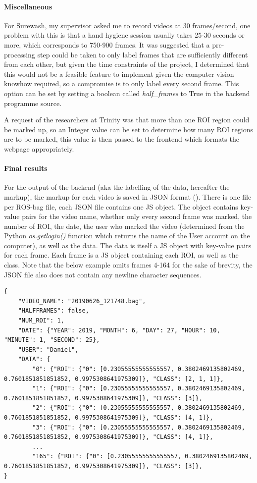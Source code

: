     \paragraph{Miscellaneous}
    For Surewash, my supervisor asked me to record videos at 30 frames/second, one problem with this is that a hand hygiene session usually takes 25-30 seconds or more, which corresponds to 750-900 frames. It was suggested that a pre-processing step could be taken to only label frames that are sufficiently different from each other, but given the time constraints of the project, I determined that this would not be a feasible feature to implement given the computer vision knowhow required, so a compromise is to only label every second frame. This option can be set by setting a boolean called {\slshape half\_frames} to True in the backend programme source.

    A request of the researchers at Trinity was that more than one ROI region could be marked up, so an Integer value can be set to determine how many ROI regions are to be marked, this value is then passed to the frontend which formats the webpage appropriately.

    \paragraph{Final results}
    For the output of the backend (aka the labelling of the data, hereafter the markup), the markup for each video is saved in JSON format (\cite{bray2017rfc}). There is one file per ROS-bag file, each JSON file contains one JS object. The object contains key-value pairs for the video name, whether only every second frame was marked, the number of ROI, the date, the user who marked the video (determined from the Python {\slshape os.getlogin()} function which returns the name of the User account on the computer), as well as the data. The data is itself a JS object with key-value pairs for each frame. Each frame is a JS object containing each ROI, as well as the class. Note that the below example omits frames 4-164 for the sake of brevity, the JSON file also does not contain any newline character sequences.

    \begin{lstlisting}[style=JSStyle]
{
    "VIDEO_NAME": "20190626_121748.bag", 
    "HALFFRAMES": false, 
    "NUM_ROI": 1, 
    "DATE": {"YEAR": 2019, "MONTH": 6, "DAY": 27, "HOUR": 10, "MINUTE": 1, "SECOND": 25}, 
    "USER": "Daniel", 
    "DATA": {
        "0": {"ROI": {"0": [0.23055555555555557, 0.3802469135802469, 0.7601851851851852, 0.9975308641975309]}, "CLASS": [2, 1, 1]},
        "1": {"ROI": {"0": [0.23055555555555557, 0.3802469135802469, 0.7601851851851852, 0.9975308641975309]}, "CLASS": [3]}, 
        "2": {"ROI": {"0": [0.23055555555555557, 0.3802469135802469, 0.7601851851851852, 0.9975308641975309]}, "CLASS": [4, 1]}, 
        "3": {"ROI": {"0": [0.23055555555555557, 0.3802469135802469, 0.7601851851851852, 0.9975308641975309]}, "CLASS": [4, 1]},
        ...
        "165": {"ROI": {"0": [0.23055555555555557, 0.3802469135802469, 0.7601851851851852, 0.9975308641975309]}, "CLASS": [3]},
}\end{lstlisting}

